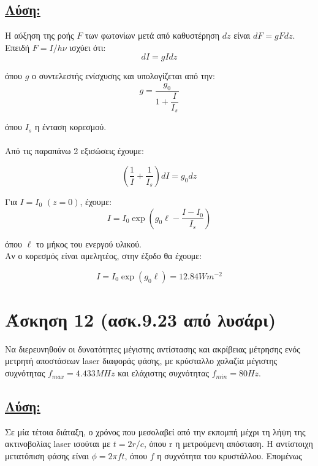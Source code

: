 \documentclass[a4paper,11pt,titlepage]{article}
\begin{document}
\subsection*{\underline{Λύση:}}

Η αύξηση της ροής $F$ των φωτονίων μετά από καθυστέρηση $dz$ είναι $dF=gFdz$. Επειδή $F=I/h\nu$ ισχύει ότι:
\begin{equation}
 dI=gIdz
\end{equation}

όπου $g$ ο συντελεστής ενίσχυσης και υπολογίζεται από την:
\begin{equation}
 g=\frac{g_0}{1+\dfrac{I}{I_s}}
\end{equation}

όπου $I_s$ η ένταση κορεσμού.
\\\\
Από τις παραπάνω 2 εξισώσεις έχουμε:

\begin{equation}
(\dfrac{1}{I}+\dfrac{1}{I_s})dI=g_0dz
\end{equation}

Για $I=I_0$ $(z=0)$, έχουμε:
\begin{equation}
 I=I_0\exp ( g_0\ell-\dfrac{I-I_0}{I_s} )
\end{equation}

όπου $\ell$ το μήκος του ενεργού υλικού. \\
Αν ο κορεσμός είναι αμελητέος, στην έξοδο θα έχουμε:

\begin{equation}
 I=I_0\exp(g_0\ell)=12.84Wm^{-2}
\end{equation}


\section{Άσκηση 12 (ασκ.9.23 από λυσάρι)}

Να διερευνηθούν οι δυνατότητες μέγιστης αντίστασης και ακρίβειας μέτρησης ενός μετρητή αποστάσεων laser διαφοράς φάσης, με κρύσταλλο χαλαζία μέγιστης συχνότητας $f_{max}=4.433MHz$ και ελάχιστης συχνότητας $f_{min}=80Hz$.

\subsection*{\underline{Λύση:}}

Σε μία τέτοια διάταξη, ο χρόνος που μεσολαβεί από την εκπομπή μέχρι τη λήψη της ακτινοβολίας laser ισούται με $t=2r/c$, όπου r η μετρούμενη απόσταση. Η αντίστοιχη μετατόπιση φάσης είναι $\phi=2\pi ft$, όπου $f$ η συχνότητα του κρυστάλλου. Επομένως
\end{document}
